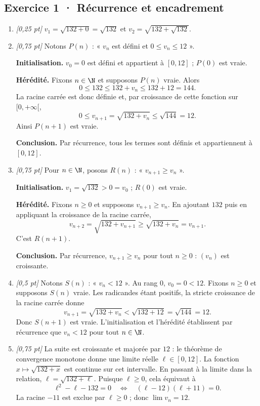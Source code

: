 \subsection*{Exercice 1 · Récurrence et encadrement}\begin{enumerate}

\item \textit{[0,25 pt]} $v_1=\sqrt{132+0}=\sqrt{132}$ et $v_2=\sqrt{132+\sqrt{132}}$.

\item \textit{[0,75 pt]} Notons $P(n)$ : « $v_n$ est défini et $0\le v_n\le 12$ ».
\par\smallskip\textbf{Initialisation.} $v_0=0$ est défini et appartient à $[0,12]$ ; $P(0)$ est vraie.
\par\smallskip\textbf{Hérédité.} Fixons $n\in\N$ et supposons $P(n)$ vraie. Alors
\[0\le 132\le 132+v_n\le 132+12=144.\]
La racine carrée est donc définie et, par croissance de cette fonction sur $[0,+\infty[$,
\[0\le v_{n+1}=\sqrt{132+v_n}\le\sqrt{144}=12.\]
Ainsi $P(n+1)$ est vraie.
\par\smallskip\textbf{Conclusion.} Par récurrence, tous les termes sont définis et appartiennent à $[0,12]$.

\item \textit{[0,75 pt]} Pour $n\in\N$, posons $R(n)$ : « $v_{n+1}\ge v_n$ ».
\par\smallskip\textbf{Initialisation.} $v_1=\sqrt{132}>0=v_0$ ; $R(0)$ est vraie.
\par\smallskip\textbf{Hérédité.} Fixons $n\ge0$ et supposons $v_{n+1}\ge v_n$. En ajoutant $132$ puis en appliquant la croissance de la racine carrée,
\[v_{n+2}=\sqrt{132+v_{n+1}}\ge\sqrt{132+v_n}=v_{n+1}.\]
C'est $R(n+1)$.
\par\smallskip\textbf{Conclusion.} Par récurrence, $v_{n+1}\ge v_n$ pour tout $n\ge0$ : $(v_n)$ est croissante.

\item \textit{[0,5 pt]} Notons $S(n)$ : « $v_n<12$ ». Au rang $0$, $v_0=0<12$.
Fixons $n\ge0$ et supposons $S(n)$ vraie. Les radicandes étant positifs, la stricte croissance de la racine carrée donne
\[v_{n+1}=\sqrt{132+v_n}<\sqrt{132+12}=\sqrt{144}=12.\]
Donc $S(n+1)$ est vraie. L'initialisation et l'hérédité établissent par récurrence que $v_n<12$ pour tout $n\in\N$.

\item \textit{[0,75 pt]} La suite est croissante et majorée par $12$ : le théorème de convergence monotone donne une limite réelle $\ell\in[0,12]$.
La fonction $x\mapsto\sqrt{132+x}$ est continue sur cet intervalle. En passant à la limite dans la relation, $\ell=\sqrt{132+\ell}$. Puisque $\ell\ge0$, cela équivaut à
\[\ell^2-\ell-132=0\quad\Longleftrightarrow\quad(\ell-12)(\ell+11)=0.\]
La racine $-11$ est exclue par $\ell\ge0$ ; donc $\lim v_n=12$.


\end{enumerate}
